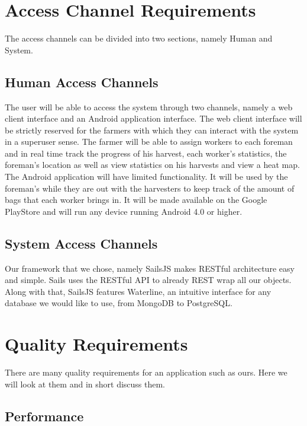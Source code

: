 \documentclass[11pt,fleqn]{book} %
\begin{document}
	\section{Access Channel Requirements}
		The access channels can be divided into two sections, namely Human and System.\newline
	\subsection{Human Access Channels}
		The user will be able to access the system through two channels, namely a web client interface and an Android application interface.\newline
		The web client interface will be strictly reserved for the farmers with which they can interact with the system in a superuser sense. The farmer will be able to assign workers to each foreman and in real time track the progress of his harvest, each worker’s statistics, the foreman’s location as well as view statistics on his harvests and view a heat map.\newline
		The Android application will have limited functionality. It will be used by the foreman’s while they are out with the harvesters to keep track of the amount of bags that each worker brings in. It will be made available on the Google PlayStore and will run any device running Android 4.0 or higher.\newline

	\subsection{System Access Channels}
		Our framework that we chose, namely SailsJS makes RESTful architecture easy and simple. Sails uses the RESTful API to already REST wrap all our objects. Along with that, SailsJS features Waterline, an intuitive interface for any 	database we would like to use, from MongoDB to PostgreSQL.\newline
	
	\section{Quality Requirements}
		There are many quality requirements for an application such as ours. Here we will look at them and in short discuss them.\newline
		\subsection{Performance}
\end{document}
